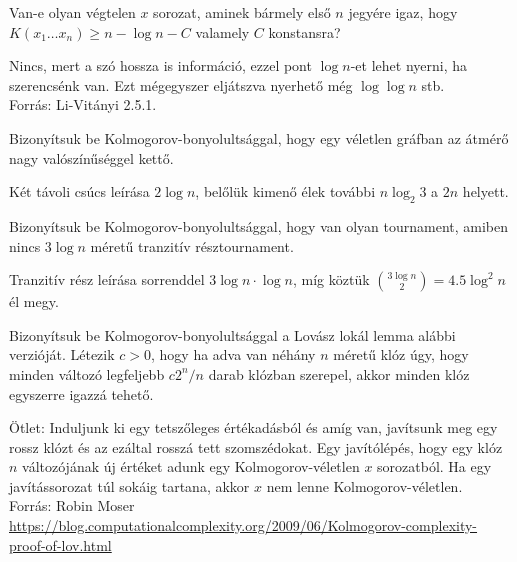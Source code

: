 \begin{Exercise}[counter={sorszam}, difficulty=1]
	Van-e olyan v\'egtelen $x$ sorozat, aminek b\'armely els\H o $n$ jegy\'ere igaz, hogy $K(x_1\ldots x_n)\ge n-\log n - C$ valamely $C$ konstansra?
\end{Exercise}	
\begin{Answer}
	Nincs, mert a sz\'o hossza is inform\'aci\'o, ezzel pont $\log n$-et lehet nyerni, ha szerencs\'enk van. Ezt m\'egegyszer elj\'atszva nyerhet\H o m\'eg $\log\log n$ stb.\\
	Forr\'as: Li-Vit\'anyi 2.5.1.
\end{Answer}

\begin{Exercise}[counter={sorszam}, difficulty=0]
	Bizony\'itsuk be Kolmogorov-bonyolults\'aggal, hogy egy v\'eletlen gr\'afban az \'atm\'er\H o nagy val\'osz\'in\H us\'eggel kett\H o.
\end{Exercise}	
\begin{Answer}
	K\'et t\'avoli cs\'ucs le\'ir\'asa $2\log n$, bel\H ol\"uk kimen\H o \'elek tov\'abbi $n \log_2 3$ a $2n$ helyett.
\end{Answer}

\begin{Exercise}[counter={sorszam}, difficulty=0]
	Bizony\'itsuk be Kolmogorov-bonyolults\'aggal, hogy van olyan tournament, amiben nincs $3 \log n$ m\'eret\H u tranzit\'iv r\'esztournament.
\end{Exercise}	
\begin{Answer}
	Tranzit\'iv r\'esz le\'ir\'asa sorrenddel $3\log n \cdot \log n$, m\'ig k\"ozt\"uk $\binom{3 \log n}2=4.5\log^2 n$ \'el megy.
\end{Answer}

\begin{Exercise}[counter={sorszam}, difficulty=1]
	Bizony\'itsuk be Kolmogorov-bonyolults\'aggal a Lov\'asz lok\'al lemma al\'abbi verzi\'oj\'at. L\'etezik $c>0$, hogy ha adva van n\'eh\'any $n$ m\'eret\H u kl\'oz \'ugy, hogy minden v\'altoz\'o legfeljebb $c2^n/n$ darab kl\'ozban szerepel, akkor minden kl\'oz egyszerre igazz\'a tehet\H o.
\end{Exercise}	
\begin{Answer}
	\"Otlet: Induljunk ki egy tetsz\H oleges \'ert\'ekad\'asb\'ol \'es am\'ig van, jav\'itsunk meg egy rossz kl\'ozt \'es az ez\'altal
	rossz\'a tett szomsz\'edokat. Egy jav\'it\'ol\'ep\'es, hogy egy kl\'oz $n$ v\'altoz\'oj\'anak \'uj \'ert\'eket adunk egy Kolmogorov-v\'eletlen $x$ sorozatb\'ol. Ha egy jav\'it\'assorozat t\'ul sok\'aig tartana, akkor $x$ nem lenne Kolmogorov-v\'eletlen.\\
	Forr\'as: Robin Moser \url{https://blog.computationalcomplexity.org/2009/06/Kolmogorov-complexity-proof-of-lov.html}
\end{Answer}


